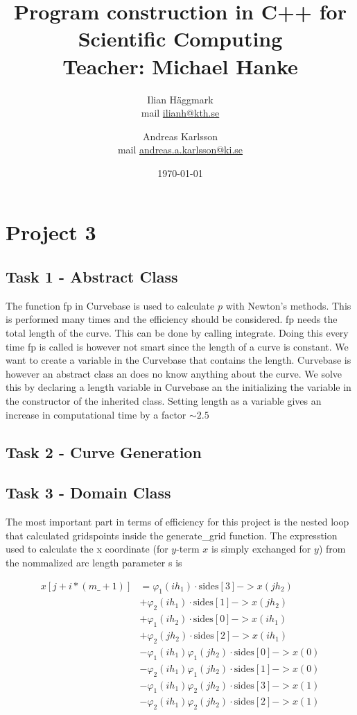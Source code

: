 \documentclass[paper=a4, fontsize=12pt]{article} %
\title{Program construction in C++ for Scientific Computing \\ Teacher: Michael Hanke}
\author{Ilian H{\"a}ggmark \\ mail \href{mailto:ilianh@kth.se}{ilianh@kth.se}
  \and Andreas Karlsson \\ mail \href{mailto:andreas.a.karlsson@ki.se}{andreas.a.karlsson@ki.se} }
\date{\normalsize\today} %
\begin{document}
\maketitle %

\section*{Project 3}
\subsection*{Task 1 - Abstract Class}

The function fp in Curvebase is used to calculate $p$ with Newton's methods. This is performed many times and the efficiency should be considered. fp needs the total length of the curve. This can be done by calling integrate. Doing this every time fp is called is however not smart since the length of a curve is constant. We want to create a variable in the Curvebase that contains the length. Curvebase is however an abstract class an does no know anything about the curve. We solve this by declaring a length variable in Curvebase an the initializing the variable in the constructor of the inherited class. Setting length as a variable gives an increase in computational time by a factor $\sim 2.5$\\



\subsection*{Task 2 - Curve Generation}

\subsection*{Task 3 - Domain Class}

The most important part in terms of efficiency for this project is the nested loop that calculated gridspoints inside the generate\_grid function. The expresstion used to calculate the x coordinate (for $y$-term $x$ is simply exchanged for $y$) from the nommalized arc length parameter s is 

\begin{align*}
x[j+i*(m\_+1)]  &= \varphi_1(ih_1)\cdot \textrm{sides}[3]->x(jh_2) \\
	&+ \varphi_2(ih_1)\cdot \textrm{sides}[1]->x(jh_2) \\
	&+ \varphi_1(ih_2)\cdot \textrm{sides}[0]->x(ih_1) \\
	&+ \varphi_2(jh_2)\cdot \textrm{sides}[2]->x(ih_1) \\	
	&- \varphi_1(ih_1) \varphi_1(jh_2) \cdot  \textrm{sides}[0]->x(0) \\
	&- \varphi_2(ih_1) \varphi_1(jh_2) \cdot  \textrm{sides}[1]->x(0) \\
	&- \varphi_1(ih_1) \varphi_2(jh_2) \cdot  \textrm{sides}[3]->x(1) \\
	&- \varphi_2(ih_1) \varphi_2(jh_2) \cdot  \textrm{sides}[2]->x(1)
\end{align*}
\end{document}
